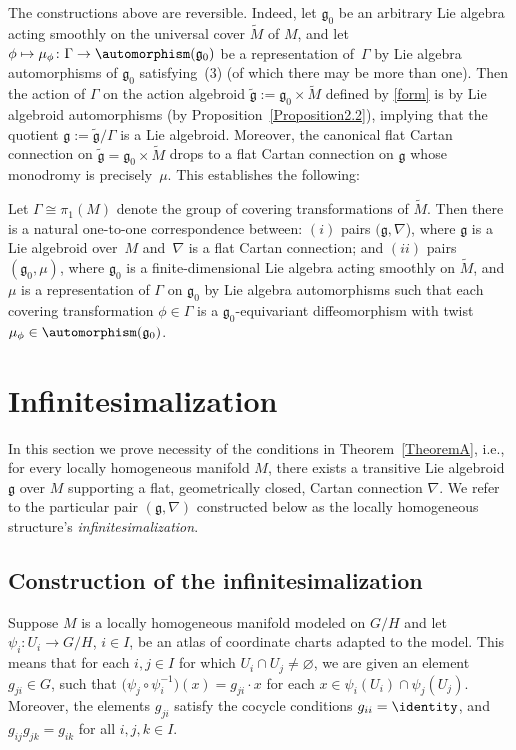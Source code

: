 The constructions above are reversible. Indeed, let ${\mathfrak g}_0$
be an arbitrary Lie algebra acting smoothly on the universal cover
$\tilde M$ of $M$, and let $\phi \mapsto \mu_\phi \colon \Gamma
\rightarrow \automorphism ({\mathfrak g}_0)$ be a representation of~$\Gamma$ by Lie algebra automorphisms of ${\mathfrak g}_0$ satisfying~(3) %
(of which there may be more than one). Then the action of
$\Gamma$ on the action algebroid $\tilde {\mathfrak g} :={\mathfrak
  g}_0 \times \tilde M$ def\/ined by \eqref{form} is by Lie algebroid
automorphisms (by Proposition~\ref{Proposition2.2}), %
implying that the
quotient ${\mathfrak g}:=\tilde {\mathfrak g} /\Gamma$ is a Lie
algebroid. Moreover, the canonical f\/lat Cartan connection on $\tilde
{\mathfrak g} ={\mathfrak g}_0 \times \tilde M$ drops to a f\/lat Cartan
connection on ${\mathfrak g}$ whose monodromy is precisely~$\mu$. This
establishes the following:

\begin{TheoremBlaom}\label{Theorem2.6}
  Let $\Gamma \cong \pi_1(M)$ denote the group of covering
  transformations of $\tilde M$. Then there is a natural one-to-one
  correspondence between: $(i)$ pairs $({\mathfrak g}, \nabla$), where
  $\mathfrak g$ is a Lie algebroid over~$M$ and~$\nabla$ is a flat
  Cartan connection; and $(ii)$ pairs $({\mathfrak g}_0,\mu)$, where
  ${\mathfrak g}_0$ is a finite-dimensional Lie algebra acting
  smoothly on $\tilde M$, and $\mu$ is a representation of $\Gamma $
  on ${\mathfrak g}_0$ by Lie algebra automorphisms such that each
  covering transformation $\phi \in \Gamma $ is a ${\mathfrak g}_0
  $-equivariant diffeomorphism with twist $\mu_\phi\in
  \automorphism({\mathfrak g}_0)$.
\end{TheoremBlaom}

\section{Inf\/initesimalization}\label{sectionI}
In this section we prove necessity of the conditions in Theorem~\ref{TheoremA},
i.e., for every locally homogeneous manifold $M$, there exists a
transitive Lie algebroid ${\mathfrak g}$ over $M$ supporting a f\/lat,
geometrically closed, Cartan connection $\nabla$. We refer to the
particular pair $({\mathfrak g}, \nabla)$ constructed below as the
locally homogeneous structure's {\it infinitesimalization}.

\subsection{Construction of the
  inf\/initesimalization}\label{infinitesimalization}
Suppose $M$ is a locally homogeneous manifold modeled on $G/H$ and let
$\psi_i \colon U_i \rightarrow G/H$, $i\in I$, be an atlas of
coordinate charts adapted to the model. This means that for each $i,j
\in I$ for which $U_i\cap U_j \ne \varnothing$, we are given an element
$g_{ji}\in G$, such that $\big(\psi_j \circ \psi_i^{-1}\big)(x) = g_{ji}\cdot
x$ for each $x\in \psi_i(U_i)\cap \psi_j(U_j)$. Moreover, the elements
$g_{ji}$ satisfy the cocycle conditions $g_{ii}=\identity$, and
$g_{ij}g_{jk}=g_{ik}$ for all $i,j,k \in I$.

